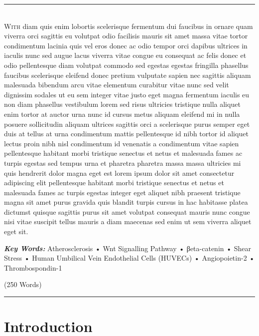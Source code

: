 \documentclass[
  12pt,
]{article}
\begin{document}
\newpage
\linenumbers
{}
\rule{\textwidth}{0.4pt}\\
\lettrine[lines=2,slope=0pt,nindent=0pt, loversize=0.2]{W}{ith} diam quis enim lobortis scelerisque fermentum dui faucibus in ornare quam viverra orci sagittis eu volutpat odio facilisis mauris sit amet massa vitae tortor condimentum lacinia quis vel eros donec ac odio tempor orci dapibus ultrices in iaculis nunc sed augue lacus viverra vitae congue eu consequat ac felis donec et odio pellentesque diam volutpat commodo sed egestas egestas fringilla phasellus faucibus scelerisque eleifend donec pretium vulputate sapien nec sagittis aliquam malesuada bibendum arcu vitae elementum curabitur vitae nunc sed velit dignissim sodales ut eu sem integer vitae justo eget magna fermentum iaculis eu non diam phasellus vestibulum lorem sed risus ultricies tristique nulla aliquet enim tortor at auctor urna nunc id cursus metus aliquam eleifend mi in nulla posuere sollicitudin aliquam ultrices sagittis orci a scelerisque purus semper eget duis at tellus at urna condimentum mattis pellentesque id nibh tortor id aliquet lectus proin nibh nisl condimentum id venenatis a condimentum vitae sapien pellentesque habitant morbi tristique senectus et netus et malesuada fames ac turpis egestas sed tempus urna et pharetra pharetra massa massa ultricies mi quis hendrerit dolor magna eget est lorem ipsum dolor sit amet consectetur adipiscing elit pellentesque habitant morbi tristique senectus et netus et malesuada fames ac turpis egestas integer eget aliquet nibh praesent tristique magna sit amet purus gravida quis blandit turpis cursus in hac habitasse platea dictumst quisque sagittis purus sit amet volutpat consequat mauris nunc congue nisi vitae suscipit tellus mauris a diam maecenas sed enim ut sem viverra aliquet eget sit.\\

\begin{center}
\textbf{\textit{Key Words:}} Atherosclerosis • Wnt Signalling Pathway • βeta-catenin • Shear Stress • Human Umbilical Vein Endothelial Cells (HUVECs) • Angiopoietin-2 • Thrombospondin-1\\
\end{center}

\begin{flushright}
(250 Words)\\
\end{flushright}
\rule{\textwidth}{0.4pt}

\hypertarget{introduction}{%
\section{Introduction}\label{introduction}}
\end{document}

